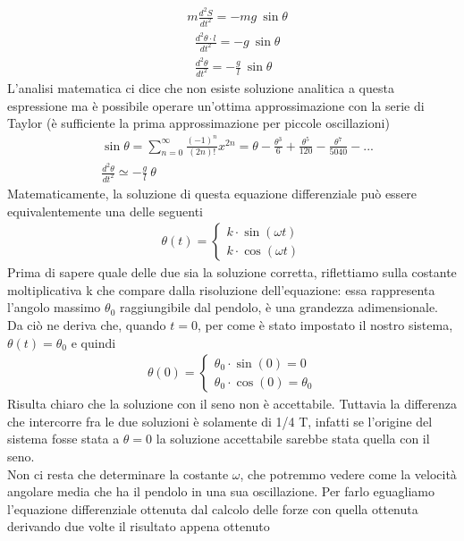 \documentclass[10pt,a4paper]{article}
\begin{document}
\begin{align}\label{eq:pendulum}
&m \frac{d^2 S}{dt^2} = -mg\ \sin \theta
\end{align}
\begin{align*}
	&\frac{d^2 \theta \cdot l}{dt^2} = -g\ \sin \theta\\
	&\frac{d^2 \theta}{dt^2} = -\frac{g}{l}\ \sin \theta
\end{align*}
L'analisi matematica ci dice che non esiste soluzione analitica a questa espressione ma è possibile operare un'ottima approssimazione con la serie di Taylor (è sufficiente la prima approssimazione per piccole oscillazioni)
\begin{align*}
&\sin\theta = \sum_{n=0}^{\infty} \frac{(-1)^n}{(2n)!} x^{2n} = \theta- \frac{\theta^3}{6}+\frac{\theta^5}{120}- \frac{\theta^7}{5040}-...\\
&\frac{d^2 \theta}{dt^2} \simeq -\frac{g}{l}\ \theta
\end{align*}
Matematicamente, la soluzione di questa equazione differenziale può essere equivalentemente una delle seguenti
\begin{align*}
	\theta(t)=
	\begin{cases}
		k\cdot \sin(\omega t)\\
		k \cdot \cos(\omega t)
	\end{cases}
\end{align*}
Prima di sapere quale delle due sia la soluzione corretta, riflettiamo sulla costante moltiplicativa k che compare dalla risoluzione dell'equazione: essa rappresenta l'angolo massimo $\theta_0$ raggiungibile dal pendolo, è una grandezza adimensionale. Da ciò ne deriva che, quando $t= 0$, per come è stato impostato il nostro sistema, $\theta (t) = \theta_0$ e quindi 
\begin{align*}
	\theta(0)=
	\begin{cases}
    \theta_0 \cdot \sin(0) = 0\\
    \theta_0 \cdot \cos(0) = \theta_0
	\end{cases}
\end{align*}
Risulta chiaro che la soluzione con il seno non è accettabile. Tuttavia la differenza che intercorre fra le due soluzioni è solamente di 1/4 T, infatti se l'origine del sistema fosse stata a $\theta = 0$ la soluzione accettabile sarebbe stata quella con il seno. \\
Non ci resta che determinare la costante $\omega$, che potremmo vedere come la velocità angolare media che ha il pendolo in una sua oscillazione. Per farlo eguagliamo l'equazione differenziale ottenuta dal calcolo delle forze con quella ottenuta derivando due volte il risultato appena ottenuto
\end{document}
